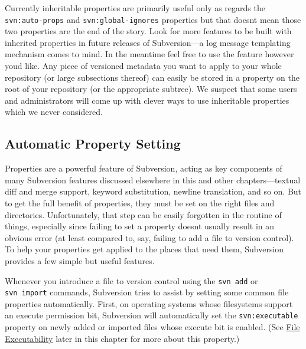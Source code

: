 Currently inheritable properties are primarily useful only as regards
the \texttt{svn:auto-props} and \texttt{svn:global-ignores} properties
but that doesn\textquotesingle t mean those two properties are the end
of the story. Look for more features to be built with inherited
properties in future releases of Subversion---a log message templating
mechanism comes to mind. In the meantime feel free to use the feature
however you\textquotesingle d like. Any piece of versioned metadata you
want to apply to your whole repository (or large subsections thereof)
can easily be stored in a property on the root of your repository (or
the appropriate subtree). We suspect that some users and administrators
will come up with clever ways to use inheritable properties which we
never considered.

\subsection{Automatic Property Setting}\label{svn.advanced.props.auto}

Properties are a powerful feature of Subversion, acting as key
components of many Subversion features discussed elsewhere in this and
other chapters---textual diff and merge support, keyword substitution,
newline translation, and so on. But to get the full benefit of
properties, they must be set on the right files and directories.
Unfortunately, that step can be easily forgotten in the routine of
things, especially since failing to set a property
doesn\textquotesingle t usually result in an obvious error (at least
compared to, say, failing to add a file to version control). To help
your properties get applied to the places that need them, Subversion
provides a few simple but useful features.

Whenever you introduce a file to version control using the
\texttt{svn\ add} or \texttt{svn\ import} commands, Subversion tries to
assist by setting some common file properties automatically. First, on
operating systems whose filesystems support an execute permission bit,
Subversion will automatically set the \texttt{svn:executable} property
on newly added or imported files whose execute bit is enabled. (See
\hyperref[svn.advanced.props.special.executable]{File Executability}
later in this chapter for more about this property.)

